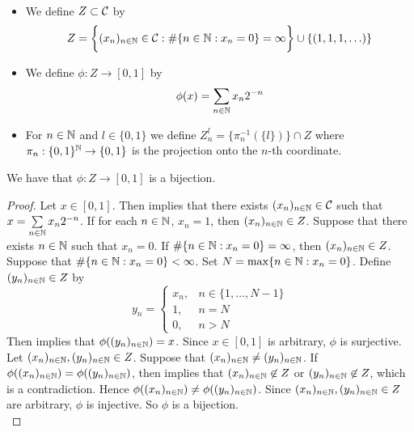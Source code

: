 \documentclass{book}
\begin{document}
	\begin{defn}  \
		\begin{itemize}
			\item We define $Z \subset \mathcal{C}$ by 
			$$Z = \bigg \{(x_n)_{n \in \mathbb{N}} \in \mathcal{C}: \# \{n \in \mathbb{N}: x_n = 0\} = \infty  \bigg \} \cup \{(1, 1, 1, \ldots)\}$$ 
			\item We define $\phi: Z \rightarrow [0,1]$ by 
			$$\phi(x) = \sum\limits_{n \in \mathbb{N}} x_n2^{-n}$$
			\item For $n \in \mathbb{N}$ and $l \in \{0,1\}$ we define $Z_n^l = \{\pi_n^{-1}(\{l\})\} \cap Z$ where $\pi_n: \{0,1 \}^{\mathbb{N}} \rightarrow \{0,1\}$ is the projection onto the $n$-th coordinate.
		\end{itemize}
	\end{defn}
	
	\begin{ex} 
		We have that $\phi:Z \rightarrow [0,1]$ is a bijection.
	\end{ex}
	
	\begin{proof}
		Let $x \in [0,1]$. Then  implies that there exists $(x_n)_{n \in \mathbb{N}} \in \mathcal{C}$ such that $x = \sum\limits_{n \in \mathbb{N}} x_n2^{-n}$. If for each $n \in \mathbb{N}$, $x_n = 1$, then $(x_n)_{n \in \mathbb{N}} \in Z$. Suppose that there exists $n \in \mathbb{N}$ such that $x_n = 0$. If $\# \{n \in \mathbb{N}: x_n = 0\} = \infty$, then $(x_n)_{n \in \mathbb{N}} \in Z$. Suppose that $ \# \{n \in \mathbb{N}: x_n = 0\} < \infty$. Set $N = \max \{ n \in \mathbb{N}: x_n = 0\}$. Define $(y_n)_{n \in \mathbb{N}} \in Z$ by 
		\[
		y_n = 
		\begin{cases}
			x_n, & n \in \{1, \ldots, N-1\} \\
			1, & n = N \\
			0, & n > N
		\end{cases}
		\]
		Then  implies that $\phi((y_n)_{n \in \mathbb{N}}) = x$. Since $x \in [0,1]$ is arbitrary, $\phi$ is surjective. \vspace{.2cm}\\  Let $(x_n)_{n \in \mathbb{N}}, (y_n)_{n \in \mathbb{N}} \in Z$. Suppose that $(x_n)_{n \in \mathbb{N}} \neq (y_n)_{n \in \mathbb{N}}$. If  $\phi((x_n)_{n \in \mathbb{N}}) = \phi((y_n)_{n \in \mathbb{N}})$, then  implies that $(x_n)_{n \in \mathbb{N}} \not \in Z$ or $(y_n)_{n \in \mathbb{N}} \not \in Z$, which is a contradiction. Hence $\phi((x_n)_{n \in \mathbb{N}}) \neq \phi((y_n)_{n \in \mathbb{N}})$. Since $(x_n)_{n \in \mathbb{N}}, (y_n)_{n \in \mathbb{N}} \in Z$ are arbitrary, $\phi$ is injective. So $\phi$ is a bijection. \\
	\end{proof}
	
\end{document}
